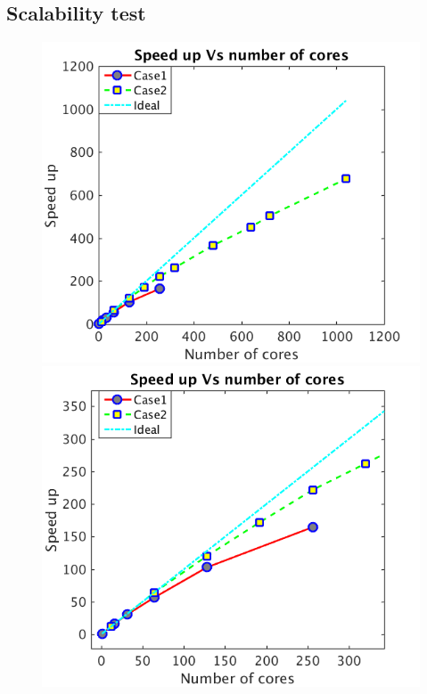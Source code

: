 \documentclass[procedia]{easychair}
\begin{document}
\subsection{Scalability test}
\begin{figure}[!t]
\centering
\includegraphics[scale=0.31]{strong_scale}
\hfil
\includegraphics[scale=0.31]{strong_scale_zoom}
\hfil

\end{figure}
\end{document}
